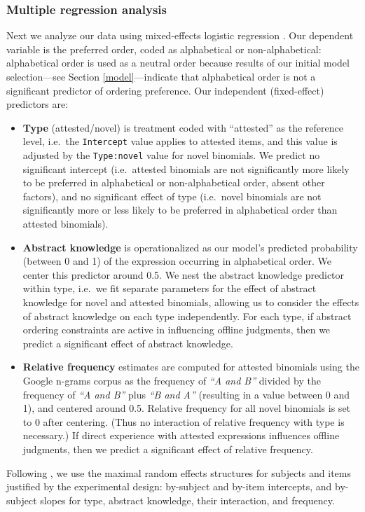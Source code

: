 \documentclass[authoryear]{elsarticle}
\begin{document}
\subsubsection{Multiple regression analysis}\label{expt1-multivariate}
Next we analyze our data using mixed-effects logistic regression \citep{TFlorianJaeger:2008ev}. Our dependent variable is the preferred order, coded as alphabetical or non-alphabetical: alphabetical order is used as a neutral order because results of our initial model selection---see Section \ref{model}---indicate that alphabetical order is not a significant predictor of ordering preference. Our independent (fixed-effect) predictors are:
\begin{itemize}
  \item \textbf{Type} (attested/novel) is treatment coded with ``attested'' as the reference level, i.e.\ the {\tt Intercept} value applies to attested items, and this value is adjusted by the {\tt Type:novel} value for novel binomials. We predict no significant intercept (i.e.\ attested binomials are not significantly more likely to be preferred in alphabetical or non-alphabetical order, absent other factors),  and no significant effect of type (i.e.\ novel binomials are not significantly more or less likely to be preferred in alphabetical order than attested binomials).
  \item  \textbf{Abstract knowledge} is operationalized as our model's predicted probability (between 0 and 1) of the expression occurring in alphabetical order. We center this predictor around 0.5. We nest the abstract knowledge predictor within type, i.e.\ we fit separate parameters for the effect of abstract knowledge for novel and attested binomials, allowing us to consider the effects of abstract knowledge on each type independently. For each type, if abstract ordering constraints are active in influencing offline judgments, then we predict a significant effect of abstract knowledge.
  \item \textbf{Relative frequency} estimates are computed for attested binomials using the Google n-grams corpus \citep{WebTgramVersio:tv} as the frequency of \emph{``A and B''} divided by the frequency of \emph{``A and B'' }plus \emph{``B and A''} (resulting in a value between 0 and 1), and centered around 0.5. Relative frequency for all novel binomials is set to 0 after centering. (Thus no interaction of relative frequency with type is necessary.) If direct experience with attested expressions influences offline judgments, then we predict a significant effect of relative frequency.
\end{itemize}
Following \citet{Barr:2013vf}, we use the maximal random effects structures for subjects and items justified by the experimental design: by-subject and by-item intercepts, and by-subject slopes for type, abstract knowledge, their interaction, and frequency.
\end{document}
